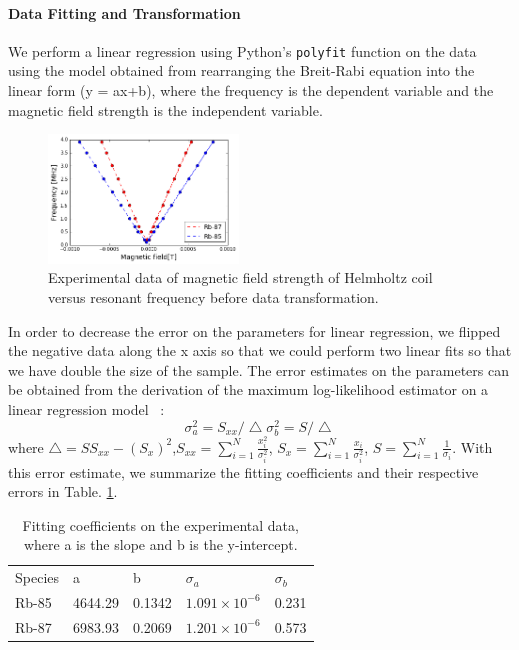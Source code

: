 \documentclass{sigchi}
\begin{document}
\paragraph{Data Fitting and Transformation}
\par We perform a linear regression using Python's \texttt{polyfit} function on the data using the model obtained from rearranging the Breit-Rabi equation into the linear form (y = ax+b), where the frequency is the dependent variable and the magnetic field strength is the independent variable.
\begin{figure}[h]
\includegraphics[width=0.45\textwidth]{plots/all_data.png}
\caption{Experimental data of magnetic field strength of Helmholtz coil versus resonant frequency before data transformation.}
\label{linear_fit}
\end{figure}
\par In order to decrease the error on the parameters for linear regression, we flipped the negative data along the x axis so that we could perform two linear fits so that we have double the size of the sample. The error estimates on the parameters can be obtained from the derivation of the  maximum log-likelihood estimator on a linear regression model ~\cite{num_rec}:
\begin{equation}
\sigma_a ^2 = S_{xx}/\bigtriangleup
\sigma_b^2 = S/\bigtriangleup
\end{equation}
where $\bigtriangleup = SS_{xx}-(S_x)^2$,$ S_{xx} = \sum^N_{i=1}\frac{x_i^2}{\sigma_i^2}$, $S_x = \sum^N_{i=1}\frac{x_i}{\sigma_i^2}$, $S =\sum^N_{i=1}\frac{1}{\sigma_i} $.
With this error estimate,  we summarize the fitting coefficients and their respective errors in Table. \ref{fitting_coefficients}.
\begin{table}[]
\centering
\caption{Fitting coefficients on the experimental data, where a is the slope and b is the y-intercept. }
\label{fitting_coefficients}
\begin{tabular}{lllll}
Species & a       & b      & $\sigma_a$ & $\sigma_b$ \\
Rb-85   & 4644.29 & 0.1342 & $1.091\times 10^{-6}$ & 0.231     \\
Rb-87   & 6983.93 & 0.2069 & $1.201\times 10^{-6}$ & 0.573    
\end{tabular}
\end{table}
\end{document}
